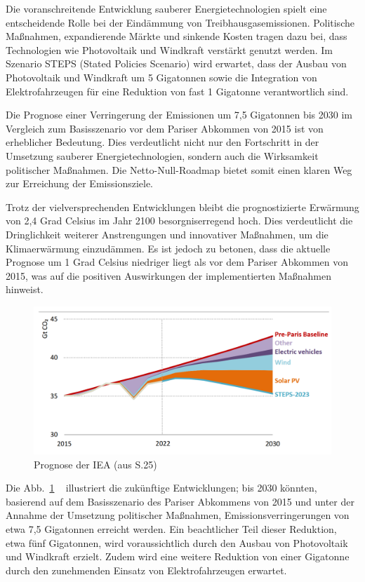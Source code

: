 \documentclass{article}
\begin{document}
Die voranschreitende Entwicklung sauberer Energietechnologien spielt eine entscheidende Rolle bei der Eindämmung von Treibhausgasemissionen. Politische Maßnahmen, expandierende Märkte und sinkende Kosten tragen dazu bei, dass Technologien wie Photovoltaik und Windkraft verstärkt genutzt werden. Im Szenario STEPS (Stated Policies Scenario) wird erwartet, dass der Ausbau von Photovoltaik und Windkraft um 5 Gigatonnen sowie die Integration von Elektrofahrzeugen für eine Reduktion von fast 1 Gigatonne verantwortlich sind.

Die Prognose einer Verringerung der Emissionen um 7,5 Gigatonnen bis 2030 im Vergleich zum Basisszenario vor dem Pariser Abkommen von 2015 ist von erheblicher Bedeutung. Dies verdeutlicht nicht nur den Fortschritt in der Umsetzung sauberer Energietechnologien, sondern auch die Wirksamkeit politischer Maßnahmen. Die Netto-Null-Roadmap bietet somit einen klaren Weg zur Erreichung der Emissionsziele.

Trotz der vielversprechenden Entwicklungen bleibt die prognostizierte Erwärmung von 2,4 Grad Celsius im Jahr 2100 besorgniserregend hoch. Dies verdeutlicht die Dringlichkeit weiterer Anstrengungen und innovativer Maßnahmen, um die Klimaerwärmung einzudämmen. Es ist jedoch zu betonen, dass die aktuelle Prognose um 1 Grad Celsius niedriger liegt als vor dem Pariser Abkommen von 2015, was auf die positiven Auswirkungen der implementierten Maßnahmen hinweist.

\begin{figure}
		\includegraphics[width=1.00\textwidth]{../Figures/global-energy-sector-co2-emissions-in-the-pre-paris-baseline-and-stated-policies-scenarios-2015-2030.png}
	\caption{Prognose der IEA (aus \cite{iea_net_zero2023PDF} S.25)
	\label{fig:global-energy-sector-CO2-emissions}}
\end{figure}

Die Abb.~\ref{fig:global-energy-sector-CO2-emissions} ~ illustriert die zukünftige Entwicklungen;  bis 2030 könnten, basierend auf dem Basisszenario des Pariser Abkommens von 2015 und unter der Annahme der Umsetzung politischer Maßnahmen, Emissionsverringerungen von etwa 7,5 Gigatonnen erreicht werden. Ein beachtlicher Teil dieser Reduktion, etwa fünf Gigatonnen, wird voraussichtlich durch den Ausbau von Photovoltaik und Windkraft erzielt. Zudem wird eine weitere Reduktion von einer Gigatonne durch den zunehmenden Einsatz von Elektrofahrzeugen erwartet.
\end{document}
